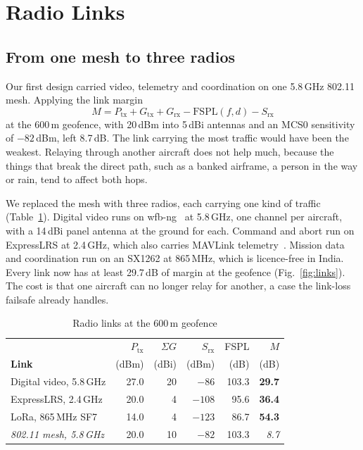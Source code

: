 \documentclass[conference]{IEEEtran}
\begin{document}
\section{Radio Links}
\label{sec:links}

\subsection{From one mesh to three radios}

Our first design carried video, telemetry and coordination on one 5.8\,GHz
802.11 mesh. Applying the link margin
\begin{equation}
M = P_{\mathrm{tx}} + G_{\mathrm{tx}} + G_{\mathrm{rx}}
    - \mathrm{FSPL}(f,d) - S_{\mathrm{rx}}
\label{eq:margin}
\end{equation}
at the 600\,m geofence, with 20\,dBm into 5\,dBi antennas and an MCS0
sensitivity of $-82$\,dBm, left 8.7\,dB. The link carrying the most traffic
would have been the weakest. Relaying through another aircraft does not help
much, because the things that break the direct path, such as a banked airframe,
a person in the way or rain, tend to affect both hops.

We replaced the mesh with three radios, each carrying one kind of traffic
(Table~\ref{tab:links}). Digital video runs on wfb-ng~\cite{wfbng} at
5.8\,GHz, one channel per aircraft, with a 14\,dBi panel antenna at the ground
for each. Command and abort run on ExpressLRS at 2.4\,GHz, which also carries
MAVLink telemetry~\cite{elrsmavlink}. Mission data and coordination run on an
SX1262 at 865\,MHz, which is licence-free in India. Every link now has at least
29.7\,dB of margin at the geofence (Fig.~\ref{fig:links}). The cost is that one
aircraft can no longer relay for another, a case the link-loss failsafe already
handles.

\begin{table}[t]
\caption{Radio links at the 600\,m geofence}
\label{tab:links}
\centering
\small
\setlength{\tabcolsep}{4pt}
\begin{tabular}{@{}lrrrrr@{}}
\toprule
 & $P_{\mathrm{tx}}$ & $\Sigma G$ & $S_{\mathrm{rx}}$ & FSPL & $M$ \\
\textbf{Link} & (dBm) & (dBi) & (dBm) & (dB) & (dB) \\
\midrule
Digital video, 5.8\,GHz & 27.0 & 20 & $-86$ & 103.3 & \textbf{29.7} \\
ExpressLRS, 2.4\,GHz & 20.0 & 4 & $-108$ & 95.6 & \textbf{36.4} \\
LoRa, 865\,MHz SF7 & 14.0 & 4 & $-123$ & 86.7 & \textbf{54.3} \\
\midrule
\emph{802.11 mesh, 5.8\,GHz} & 20.0 & 10 & $-82$ & 103.3 & \emph{8.7} \\
\bottomrule
\end{tabular}
\end{table}
\end{document}
